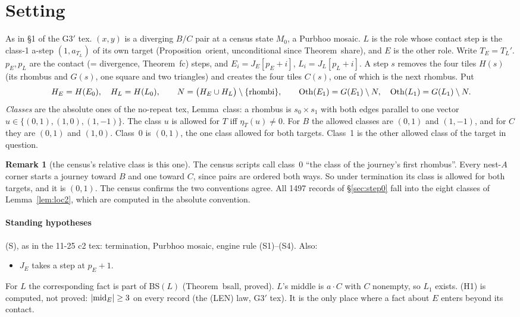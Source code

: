 \documentclass[11pt]{article}
\theoremstyle{definition}\newtheorem{definition}[theorem]{Definition}\newtheorem{remark}[theorem]{Remark}
\begin{document}
\section{Setting}\label{sec:set}
As in \S1 of the G3$'$ tex. $(x,y)$ is a diverging $B/C$ pair at a census state $M_0$, a Purbhoo mosaic. $L$ is the role whose contact step is the class-1 a-step $(1,a_{T_L})$ of its own target (Proposition~orient, unconditional since Theorem~share), and $E$ is the other role. Write $T_E=T_L'$. $p_E,p_L$ are the contact (= divergence, Theorem~fc) steps, and $E_i=J_E[p_E+i]$, $L_i=J_L[p_L+i]$. A step $s$ removes the four tiles $H(s)$ (its rhombus and $G(s)$, one square and two triangles) and creates the four tiles $C(s)$, one of which is the next rhombus. Put
\[H_E=H(E_0),\quad H_L=H(L_0),\qquad N=\bigl(H_E\cup H_L\bigr)\setminus\{\text{rhombi}\},\qquad \operatorname{Oth}(E_1)=G(E_1)\setminus N,\quad \operatorname{Oth}(L_1)=G(L_1)\setminus N.\]
\emph{Classes} are the absolute ones of the no-repeat tex, Lemma~class: a rhombus is $s_0\times s_1$ with both edges parallel to one vector $u\in\{(0,1),(1,0),(1,-1)\}$. The class $u$ is allowed for $T$ iff $\eta_T(u)\neq0$. For $B$ the allowed classes are $(0,1)$ and $(1,-1)$, and for $C$ they are $(0,1)$ and $(1,0)$. Class~0 is $(0,1)$, the one class allowed for both targets. Class~1 is the other allowed class of the target in question.
\begin{remark}[the census's relative class is this one]
The census scripts call class~0 ``the class of the journey's first rhombus''. Every nest-$A$ corner starts a journey toward $B$ and one toward $C$, since pairs are ordered both ways. So under termination its class is allowed for both targets, and it is $(0,1)$. The census confirms the two conventions agree. All 1497 records of \S\ref{sec:step0} fall into the eight classes of Lemma~\ref{lem:loc2}, which are computed in the absolute convention.
\end{remark}
\paragraph{Standing hypotheses} (S), as in the 11-25 c2 tex: termination, Purbhoo mosaic, engine rule (S1)--(S4). Also:
\begin{itemize}
\item[(H1)] $J_E$ takes a step at $p_E+1$.
\end{itemize}
For $L$ the corresponding fact is part of BS$(L)$ (Theorem~bsall, proved). $L$'s middle is $a\cdot C$ with $C$ nonempty, so $L_1$ exists. (H1) is computed, not proved: $|{\rm mid}_E|\ge3$ on every record (the (LEN) law, G3$'$ tex). It is the only place where a fact about $E$ enters beyond its contact.
\end{document}
